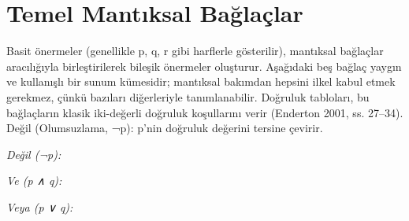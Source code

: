 \section{Temel Mantıksal Bağlaçlar}\label{sec:baglaclar}

Basit önermeler (genellikle p, q, r gibi harflerle gösterilir), mantıksal bağlaçlar aracılığıyla birleştirilerek bileşik önermeler oluşturur. Aşağıdaki beş bağlaç yaygın ve kullanışlı bir sunum kümesidir; mantıksal bakımdan hepsini ilkel kabul etmek gerekmez, çünkü bazıları diğerleriyle tanımlanabilir. Doğruluk tabloları, bu bağlaçların klasik iki-değerli doğruluk koşullarını verir (Enderton 2001, ss. 27–34). Değil (Olumsuzlama, ¬p): p’nin doğruluk değerini tersine çevirir.

\par\smallskip\begin{center}{\small\itshape\sffamily\color{gray}Değil (¬p):}\par{}\end{center}\par\smallskip

\par\smallskip\begin{center}{\small\itshape\sffamily\color{gray}Ve (p ∧ q):}\par{}\end{center}\par\smallskip

\par\smallskip\begin{center}{\small\itshape\sffamily\color{gray}Veya (p ∨ q):}\par{}\end{center}\par\smallskip

